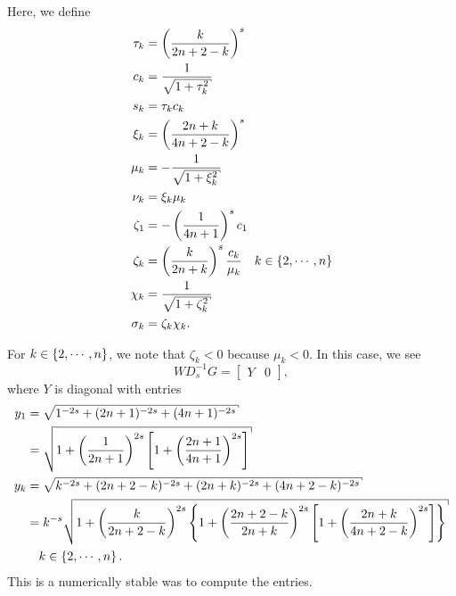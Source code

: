 \noindent
Here, we define
%
\begin{align}
    \tau_{k} &= \parens{\frac{k}{2n+2-k}}^{s} \nonumber\\
    c_{k} &= \frac{1}{\sqrt{1 + \tau_{k}^{2}}} \nonumber\\
    s_{k} &= \tau_{k}c_{k} \nonumber\\
    \xi_{k} &= \parens{\frac{2n+k}{4n+2-k}}^{s} \nonumber\\
    \mu_{k} &= -\frac{1}{\sqrt{1 + \xi_{k}^{2}}} \nonumber\\
    \nu_{k} &= \xi_{k}\mu_{k} \nonumber\\
    \zeta_{1} &= -\parens{\frac{1}{4n+1}}^{s}c_{1} \nonumber\\
    \zeta_{k} &= \parens{\frac{k}{2n+k}}^{s}\frac{c_{k}}{\mu_{k}}
        \quad k\in\braces{2,\cdots,n} \nonumber\\
    \chi_{k} &= \frac{1}{\sqrt{1 + \zeta_{k}^{2}}} \nonumber\\
    \sigma_{k} &= \zeta_{k} \chi_{k}.
\end{align}

\noindent
For $k\in\left\{ 2,\cdots,n \right\}$, we note that $\zeta_{k} < 0$
because $\mu_{k} < 0$.
In this case, we see
%
\begin{equation}
    WD_{s}^{-1}G = \begin{bmatrix} Y & 0 \end{bmatrix},
\end{equation}
%
where $Y$ is diagonal with entries
%
\begin{align}
    y_{1} &= \sqrt{1^{-2s} + (2n+1)^{-2s} + (4n+1)^{-2s}} \nonumber\\
            &= \sqrt{1 + \parens{\frac{1}{2n+1}}^{2s}\brackets{
                1 + \parens{\frac{2n+1}{4n+1}}^{2s}}} \nonumber\\
    y_{k} &= \sqrt{k^{-2s} + (2n+2-k)^{-2s} + (2n+k)^{-2s} + (4n+2-k)^{-2s}}
                \nonumber\\
            &= k^{-s}\sqrt{1 + \parens{\frac{k}{2n+2-k}}^{2s}\braces{
                1 + \parens{\frac{2n+2-k}{2n+k}}^{2s}\brackets{1 + 
        \parens{\frac{2n+k}{4n+2-k}}^{2s}}}} \nonumber\\
        &\quad k\in\braces{2,\cdots,n}.
\end{align}
%
This is a numerically stable was to compute the entries.



